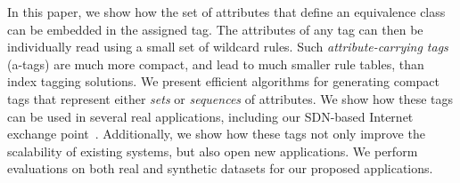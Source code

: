 


In this paper, we show how the set of attributes that define an equivalence class can be embedded in the assigned tag. The attributes of any tag can then be individually read using a small set of wildcard rules.  Such \emph{attribute-carrying tags} (a-tags) are much more compact, and lead to much smaller rule tables, than index tagging solutions.  We present efficient algorithms for generating compact tags that represent either \emph{sets} or \emph{sequences} of attributes.  We show how these tags can be used in several real applications, including our SDN-based Internet exchange point~\cite{isdx}.  Additionally, we show how these tags not only improve the scalability of existing systems, but also open new applications. We perform evaluations on both real and synthetic datasets for our proposed applications.


